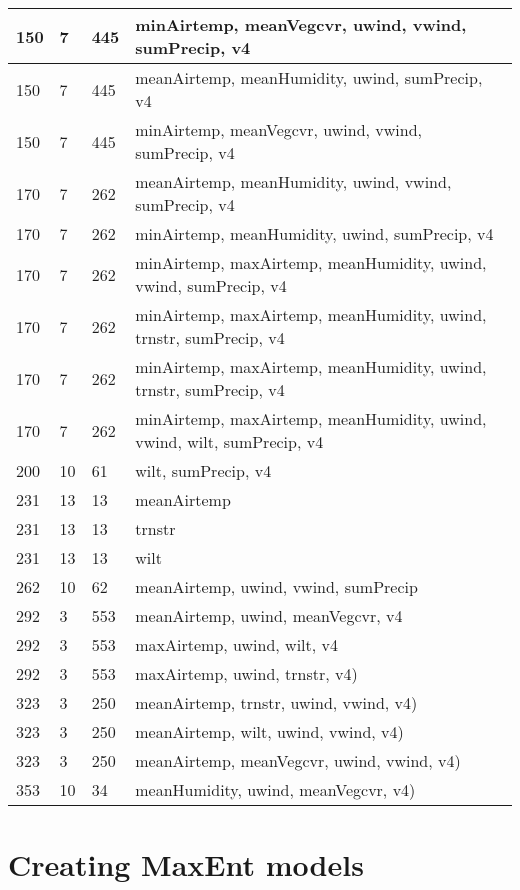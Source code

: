 \begin{longtable}{ |p{3cm}||p{3cm}|p{3cm}|p{3cm}|  }
 \hline
 150 & 7  & 445 & minAirtemp, meanVegcvr, uwind, vwind, sumPrecip, v4\\
 \hline
150 & 7  & 445 & meanAirtemp, meanHumidity, uwind, sumPrecip, v4\\
 \hline
 150 & 7  & 445 & minAirtemp, meanVegcvr, uwind, vwind, sumPrecip, v4\\
  \hline
 170 & 7  & 262 & meanAirtemp, meanHumidity, uwind, vwind, sumPrecip, v4\\
 \hline
 170 & 7  & 262 & minAirtemp, meanHumidity, uwind, sumPrecip, v4\\
 \hline
 170 & 7  & 262 & minAirtemp, maxAirtemp, meanHumidity, uwind, vwind, sumPrecip, v4\\
 \hline
  170 & 7  & 262 & minAirtemp, maxAirtemp, meanHumidity, uwind, trnstr, sumPrecip, v4\\
 \hline
   170 & 7  & 262 & minAirtemp, maxAirtemp, meanHumidity, uwind, trnstr, sumPrecip, v4\\
 \hline
   170 & 7  & 262 & minAirtemp, maxAirtemp, meanHumidity, uwind, vwind, wilt, sumPrecip, v4\\
 \hline
    200 & 10  & 61 & wilt, sumPrecip, v4\\
 \hline
     231 & 13  & 13 & meanAirtemp\\
 \hline
      231 & 13  & 13 & trnstr\\
 \hline
      231 & 13  & 13 & wilt\\
 \hline
       262 & 10  & 62 & meanAirtemp, uwind, vwind, sumPrecip\\
 \hline
        292 & 3  & 553 & meanAirtemp, uwind, meanVegcvr, v4\\
 \hline
         292 & 3  & 553 & maxAirtemp, uwind, wilt, v4\\
 \hline
          292 & 3  & 553 & maxAirtemp, uwind, trnstr, v4)\\
 \hline
          323 & 3  & 250 & meanAirtemp, trnstr, uwind, vwind, v4)\\
 \hline
           323 & 3  & 250 & meanAirtemp, wilt, uwind, vwind, v4)\\
 \hline
            323 & 3  & 250 & meanAirtemp, meanVegcvr, uwind, vwind, v4)\\
 \hline
             353 & 10  & 34 & meanHumidity, uwind, meanVegcvr, v4)\\
 \hline
\end{longtable}

\section{Creating MaxEnt models}

